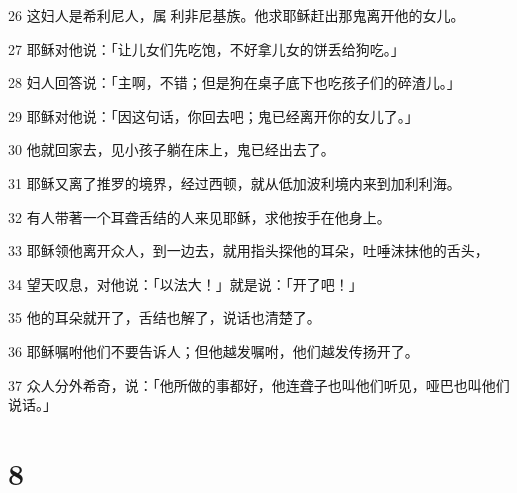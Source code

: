 \par 26 这妇人是希利尼人，属利非尼基族。他求耶稣赶出那鬼离开他的女儿。
\par 27 耶稣对他说：「让儿女们先吃饱，不好拿儿女的饼丢给狗吃。」
\par 28 妇人回答说：「主啊，不错；但是狗在桌子底下也吃孩子们的碎渣儿。」
\par 29 耶稣对他说：「因这句话，你回去吧；鬼已经离开你的女儿了。」
\par 30 他就回家去，见小孩子躺在床上，鬼已经出去了。
\par 31 耶稣又离了推罗的境界，经过西顿，就从低加波利境内来到加利利海。
\par 32 有人带著一个耳聋舌结的人来见耶稣，求他按手在他身上。
\par 33 耶稣领他离开众人，到一边去，就用指头探他的耳朵，吐唾沫抹他的舌头，
\par 34 望天叹息，对他说：「以法大！」就是说：「开了吧！」
\par 35 他的耳朵就开了，舌结也解了，说话也清楚了。
\par 36 耶稣嘱咐他们不要告诉人；但他越发嘱咐，他们越发传扬开了。
\par 37 众人分外希奇，说：「他所做的事都好，他连聋子也叫他们听见，哑巴也叫他们说话。」

\chapter{8}

